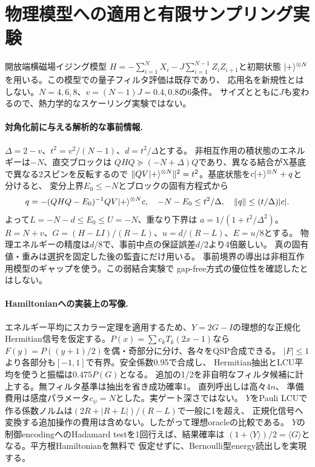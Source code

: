 \section{物理模型への適用と有限サンプリング実験}\label{sec:physical}
開放端横磁場イジング模型
$H=-\sum_{i=1}^NX_i-J\sum_{i=1}^{N-1}Z_iZ_{i+1}$と初期状態
$\lvert +\rangle^{\otimes N}$を用いる。この模型での量子フィルタ評価は既存であり\cite{QETU}、
応用名を新規性とはしない。$N=4,6,8$、$v=(N-1)J=0.4,0.8$の6条件。
サイズとともに$J$も変わるので、熱力学的なスケーリング実験ではない。

\paragraph{対角化前に与える解析的な事前情報.}
$\Delta=2-v$、$t^2=v^2/(N-1)$、$d=t^2/\Delta$とする。
非相互作用の積状態のエネルギーは$-N$、直交ブロックは
$QHQ\succeq(-N+\Delta)Q$であり、異なる結合がX基底で異なる2スピンを反転するので
$\|QV\lvert +\rangle^{\otimes N}\|^2=t^2$。基底状態を$c\lvert +\rangle^{\otimes N}+q$と分けると、
変分上界$E_0\leq-N$とブロックの固有方程式から
\[
 q=-(QHQ-E_0)^{-1}QV\lvert +\rangle^{\otimes N}c,\quad
 -N-E_0\leq t^2/\Delta,\quad \|q\|\leq(t/\Delta)|c|.
\]
よって$L=-N-d\leq E_0\leq U=-N$、重なり下界は
$a=1/(1+t^2/\Delta^2)$。
$R=N+v$、$G=(H-LI)/(R-L)$、$u=d/(R-L)$、$E=u/8$とする。
物理エネルギーの精度は$d/8$で、事前中点の保証誤差$d/2$より4倍厳しい。
真の固有値・重みは選択を固定した後の監査にだけ用いる。
事前境界の導出は非相互作用模型のギャップを使う。この弱結合実験で
gap-free方式の優位性を確認したとはしない。

\paragraph{Hamiltonianへの実装上の写像.}
エネルギー平均にスカラー定理を適用するため、$Y=2G-I$の理想的な正規化
Hermitian信号を仮定する。$P(x)=\sum c_kT_k(2x-1)$なら
$F(y)=P((y+1)/2)$を偶・奇部分に分け、各々をQSP合成できる。
$|F|\leq1$より各部分も$[-1,1]$で有界。安全係数0.95で合成し、
Hermitian抽出とLCU平均を使うと振幅は$0.475P(G)$となる。
追加の1/2を非自明なフィルタ候補に計上する。無フィルタ基準は抽出を省き成功確率1。
直列呼出しは高々$4n$、
準備費用は感度パラメータ$c_\psi=N$とした。実ゲート深さではない。
$Y$をPauli LCUで作る係数ノルムは$(2R+|R+L|)/(R-L)$で一般に1を超え、
正規化信号へ変換する追加操作の費用は含めない。したがって理想oracleの比較である。
$Y$の制御encodingへのHadamard testを1回行えば、結果確率は
$(1+\langle Y\rangle)/2=\langle G\rangle$となる。平方根Hamiltonianを無料で
仮定せずに、Bernoulli型energy読出しを実現する。

